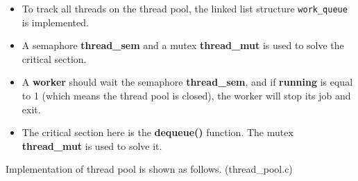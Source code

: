 \documentclass[UTF8,10pt,a4paper]{article}
\theoremstyle{Problem}
\theoremstyle{Solution}
\begin{document}
\begin{itemize}
    \item To track all threads on the thread pool, the linked list structure \texttt{work\_queue} is implemented.
    \item A semaphore \textbf{thread\_sem} and a mutex \textbf{thread\_mut} is used to solve the critical section.
    \item A \textbf{worker} should wait the semaphore \textbf{thread\_sem}, and if \textbf{running} is equal to 1 (which means the thread pool is closed), the worker will stop its job and exit.
    \item The critical section here is the \textbf{dequeue()} function. The mutex \textbf{thread\_mut} is used to solve it.
\end{itemize}


Implementation of thread pool is shown as follows. (thread\_pool.c)
\end{document}
